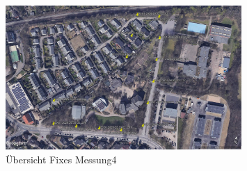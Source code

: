 \begin{figure}[h!]
    \centering
    \includegraphics[width=0.8\textwidth]{Route4}
    \caption{Übersicht Fixes Messung4}
    \label{fig:map}
\end{figure}
	
